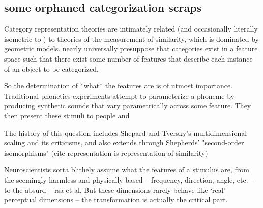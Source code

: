 \begin{multicols}{2}
\subsection{some orphaned categorization scraps}

Category representation theories are intimately related (and occasionally literally isometric to \cite{Edelman1998}) to theories of the measurement of similarity, which is dominated by geometric models\cite{Tversky1977}. nearly universally presuppose that categories exist in a feature space such that there exist some number of features that describe each instance of an object to be categorized.

So the determination of *what* the features are is of utmost importance. Traditional phonetics experiments attempt to parameterize a phoneme by producing synthetic sounds that vary parametrically across some feature. They then present these stimuli to people and 

The history of this question includes Shepard and Tversky's multidimensional scaling and its criticisms, and also extends through Shepherds' "second-order isomorphisms" (cite representation is representation of similarity)

Neuroscientists sorta blithely assume what the features of a stimulus are, from the seemingly harmless and physically based -- frequency, direction, angle, etc. -- to the absurd -- rsa et al. But these dimensions rarely behave like `real' perceptual dimensions \cite{krantzSimilarityRectanglesAnalysis1975a} -- the transformation is actually the critical part. 


\end{multicols}
